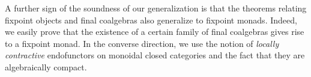 \documentclass[11pt,a4paper]{article}
\begin{document}
A further sign of the soundness of our generalization is
that the theorems relating fixpoint objects
and final coalgebras \cite{Fre90}
also generalize to fixpoint monads.
Indeed, we easily prove that the existence of
a certain family of final coalgebras
gives rise to a fixpoint monad.
In the converse direction,
we use the notion of 
\emph{locally contractive} endofunctors
on monoidal closed categories
and the fact that they are algebraically compact.










\end{document}
